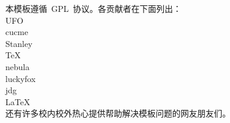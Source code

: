 


本模板遵循~GPL~协议。各贡献者在下面列出：\\
UFO\\
cucme\\
Stanley\\
TeX\\
nebula\\
luckyfox\\
jdg\\
LaTeX\\
还有许多校内校外热心提供帮助解决模板问题的网友朋友们。
